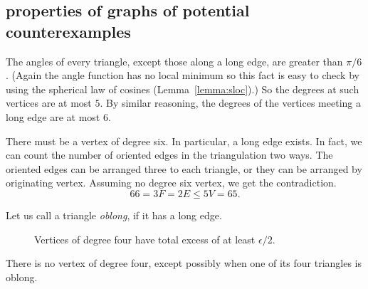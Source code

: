 \subsection{properties of  graphs of potential counterexamples}


The angles of every triangle, except those along a long edge, are
greater than $\pi/6$. (Again the angle function has no local
minimum so this fact is easy to check by using the spherical law of cosines (Lemma~\ref{lemma:sloc}).) So
the degrees at such vertices are at most $5$.  By similar
reasoning, the degrees of the
vertices meeting a long edge are at most $6$.



There must be a vertex of degree six.  In particular, a long edge
exists.  In fact, we can count the number of oriented edges in the
triangulation two ways.  The oriented edges can be arranged three
to each triangle, or they can be arranged by originating vertex.
Assuming no degree six vertex, we get the contradiction.
    $$66 = 3 F =2E \le 5 V = 65.$$

Let us call a triangle {\it oblong}, if it has a long edge.

\begin{figure}[htb]
  \centering
  \caption{Vertices of degree four have total
excess of at least $\epsilon/2$.}
  \label{fig:13:C}
\end{figure}

\begin{lemma}  There is no vertex of degree four, except possibly
when one of its four triangles is oblong.
\end{lemma}

